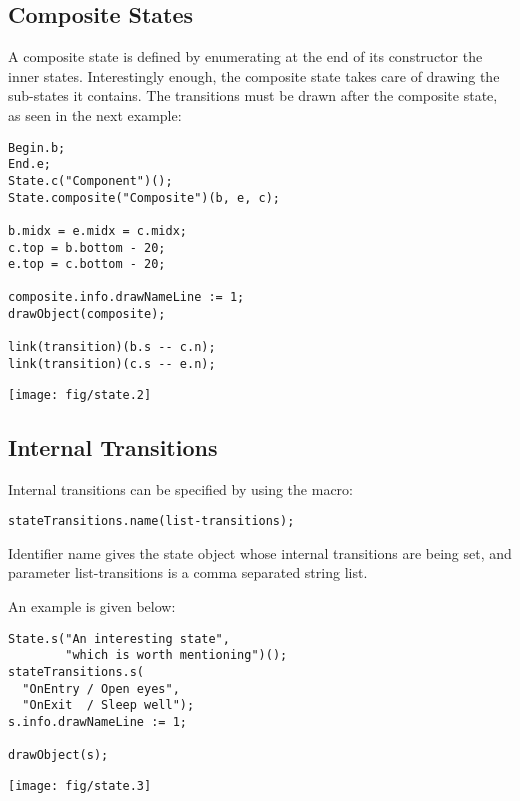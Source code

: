 \documentclass{article}
\newcommand{\code}{\ttfamily}
\begin{document}
\subsection{Composite States}
\label{composite-states}

A composite state is defined by enumerating at the end of its constructor the inner
states. Interestingly enough, the composite state takes care of drawing the sub-states it
contains. The transitions must be drawn after the composite state, as seen in the
next example:

\begin{multicols}{2}
\begin{verbatim}
Begin.b;
End.e;
State.c("Component")();
State.composite("Composite")(b, e, c);

b.midx = e.midx = c.midx;
c.top = b.bottom - 20;
e.top = c.bottom - 20;

composite.info.drawNameLine := 1;
drawObject(composite);

link(transition)(b.s -- c.n);
link(transition)(c.s -- e.n);
\end{verbatim}
\columnbreak
\hspace{1cm}\texttt{[image: fig/state.2]}
\end{multicols}

\subsection{Internal Transitions}

Internal transitions can be specified by using the macro:
\begin{verbatim}
stateTransitions.name(list-transitions);
\end{verbatim}

Identifier {\code name} gives the state object whose internal transitions are being set,
and parameter {\code list-transitions} is a comma separated string list.


An example is given below:

\begin{multicols}{2}
\begin{verbatim}
State.s("An interesting state",
        "which is worth mentioning")();
stateTransitions.s(
  "OnEntry / Open eyes",
  "OnExit  / Sleep well");
s.info.drawNameLine := 1;

drawObject(s);
\end{verbatim}
\columnbreak
\hspace{1cm}\texttt{[image: fig/state.3]}
\end{multicols}
\end{document}

